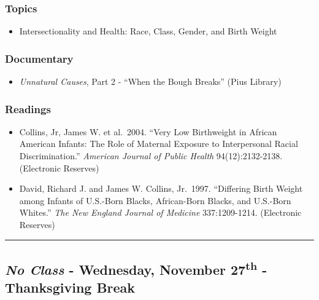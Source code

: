 \documentclass[]{book}
\providecommand{\tightlist}{%
  \setlength{\itemsep}{0pt}\setlength{\parskip}{0pt}}
\begin{document}
\hypertarget{topics-26}{%
\subsubsection*{Topics}\label{topics-26}}

\begin{itemize}
\tightlist
\item
  Intersectionality and Health: Race, Class, Gender, and Birth Weight
\end{itemize}

\hypertarget{documentary-3}{%
\subsubsection*{Documentary}\label{documentary-3}}

\begin{itemize}
\tightlist
\item
  \emph{Unnatural Causes}, Part 2 - ``When the Bough Breaks'' (Pius Library)
\end{itemize}

\hypertarget{readings-24}{%
\subsubsection*{Readings}\label{readings-24}}

\begin{itemize}
\tightlist
\item
  Collins, Jr, James W. et al.~2004. ``Very Low Birthweight in African American Infants: The Role of Maternal Exposure to Interpersonal Racial Discrimination.'' \emph{American Journal of Public Health} 94(12):2132-2138. (Electronic Reserves)
\item
  David, Richard J. and James W. Collins, Jr.~1997. ``Differing Birth Weight among Infants of U.S.-Born Blacks, African-Born Blacks, and U.S.-Born Whites.'' \emph{The New England Journal of Medicine} 337:1209-1214. (Electronic Reserves)
\end{itemize}

\begin{center}\rule{0.5\linewidth}{\linethickness}\end{center}

\hypertarget{no-class---wednesday-november-27th---thanksgiving-break}{%
\subsection*{\texorpdfstring{\emph{No Class} - Wednesday, November 27\textsuperscript{th} - Thanksgiving Break}{No Class - Wednesday, November 27th - Thanksgiving Break}}\label{no-class---wednesday-november-27th---thanksgiving-break}}
\end{document}
